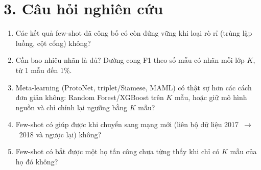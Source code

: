 \documentclass[10pt,a4paper,landscape]{article}
\begin{document}
\section*{3. Câu hỏi nghiên cứu}
\begin{enumerate}[label=\textbf{RQ\arabic*}]
  \item Các kết quả few-shot đã công bố có còn đứng vững khi loại rò rỉ (trùng lặp luồng, cột cổng) không?
  \item Cần bao nhiêu nhãn là đủ? Đường cong F1 theo số mẫu có nhãn mỗi lớp $K$, từ 1 mẫu đến 1\%.
  \item Meta-learning (ProtoNet, triplet/Siamese, MAML) có thật sự hơn các cách đơn giản không: Random Forest/XGBoost trên $K$ mẫu, hoặc giữ mô hình nguồn và chỉ chỉnh lại ngưỡng bằng $K$ mẫu?
  \item Few-shot có giúp được khi chuyển sang mạng mới (liên bộ dữ liệu 2017~$\rightarrow$~2018 và ngược lại) không?
  \item Few-shot có bắt được một họ tấn công chưa từng thấy khi chỉ có $K$ mẫu của họ đó không?
\end{enumerate}
\end{document}
